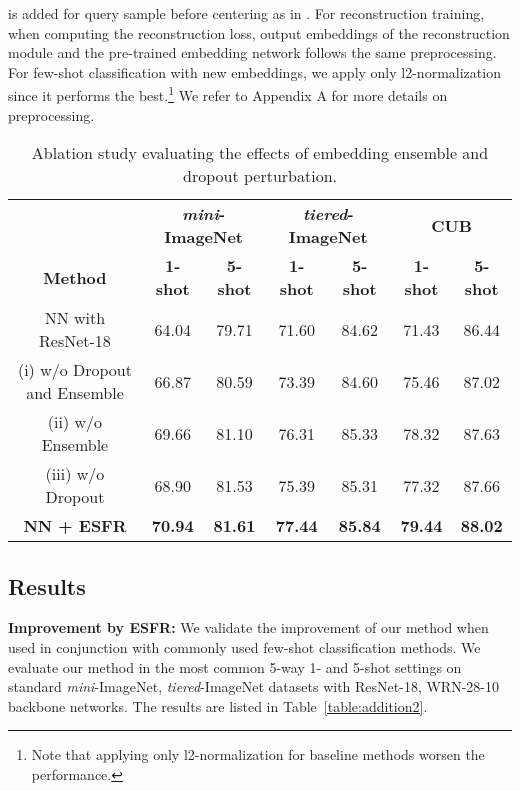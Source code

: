 \documentclass{article}
\begin{document}
is added for query sample before centering as in \citet{LaplacianShot, BDCSPN}. For reconstruction training, when computing the reconstruction loss, output embeddings of the reconstruction module and the pre-trained embedding network follows the same preprocessing. For few-shot classification with new embeddings, we apply only l2-normalization since it performs the best.\footnote{Note that applying only l2-normalization for baseline methods worsen the performance.} We refer to Appendix A for more details on preprocessing. \begin{table*}[t]
	\caption{Ablation study evaluating the effects of embedding ensemble and dropout perturbation.}
	\label{table:ablation}
	\begin{small}
		\begin{center}
			\begin{tabular}{c|cc|cc|cc}
				\hline
				& \multicolumn{2}{c|}{\textbf{\textit{mini}-ImageNet}} & \multicolumn{2}{c|}{\textbf{\textit{tiered}-ImageNet}} & \multicolumn{2}{c|}{\textbf{CUB}}          \\
				\textbf{Method}                                         & \textbf{1-shot}      & \textbf{5-shot}      & \textbf{1-shot}       & \textbf{5-shot}       & \textbf{1-shot} & \textbf{5-shot} \\ \hline
				NN with ResNet-18                                     & 64.04                & 79.71                & 71.60                 & 84.62                 & 71.43           & 86.44           \\ \hline
				(i) w/o Dropout and Ensemble                        & 66.87                & 80.59                & 73.39                 & 84.60                 & 75.46           & 87.02           \\
				(ii) w/o Ensemble                                       & 69.66                & 81.10                & 76.31                 & 85.33                 & 78.32           & 87.63           \\
				(iii) w/o Dropout                                   & 68.90                & 81.53                & 75.39                 & 85.31                 & 77.32          & 87.66           \\
				\rowcolor[HTML]{EFEFEF} \textbf{NN + ESFR} & \textbf{70.94}       & \textbf{81.61}       & \textbf{77.44}        & \textbf{85.84}        & \textbf{79.44}  & \textbf{88.02}  \\ \hline
			\end{tabular}
		\end{center}
	\end{small}
	\vskip -0.2in
\end{table*} \subsection{Results}
\label{subsection:main_results}
\textbf{Improvement by ESFR:}
We validate the improvement of our method when used in conjunction with commonly used few-shot classification methods. We evaluate our method in the most common 5-way 1- and 5-shot settings on standard \textit{mini}-ImageNet, \textit{tiered}-ImageNet datasets with ResNet-18, WRN-28-10 backbone networks. The results are listed in Table~\ref{table:addition2}.
\end{document}
